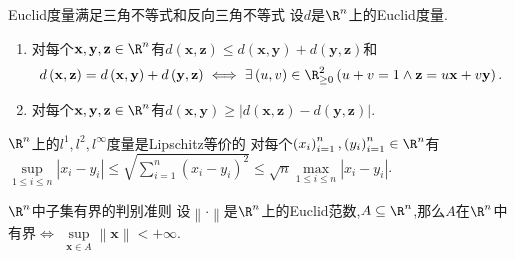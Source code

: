\begin{corollary}{Euclid度量满足三角不等式和反向三角不等式}{}
	设$d$是$\R^{n}$上的Euclid度量.
	\begin{enumerate}
		\item 对每个$\mathbf{x},\mathbf{y},\mathbf{z}\in\R^{n}$有$d\left(\mathbf{x},\mathbf{z}\right)\leq d\left(\mathbf{x},\mathbf{y}\right)+d\left(\mathbf{y},\mathbf{z}\right)$和
		\begin{align*}
			d\left(\mathbf{x},\mathbf{z}\right)=d\left(\mathbf{x},\mathbf{y}\right)+d\left(\mathbf{y},\mathbf{z}\right)\iff\exists\left(u,v\right)\in\R_{\geq 0}^{2}\left(u+v=1\wedge\mathbf{z}=u\mathbf{x}+v\mathbf{y}\right).
		\end{align*}
		\item 对每个$\mathbf{x},\mathbf{y},\mathbf{z}\in\R^{n}$有$d\left(\mathbf{x},\mathbf{y}\right)\geq\left|d\left(\mathbf{x},\mathbf{z}\right)-d\left(\mathbf{y},\mathbf{z}\right)\right|$.
	\end{enumerate}
\end{corollary}

\begin{proposition}{$\R^{n}$上的$l^{1},l^{2},l^{\infty}$度量是Lipschitz等价的}{}
	对每个$\left(x_{i}\right)_{i=1}^{n},\left(y_{i}\right)_{i=1}^{n}\in\R^{n}$有$\sup\limits_{1\leqslant i\leqslant n}\left|x_{i}-y_{i}\right|\leqslant\sqrt{\sum\limits_{i=1}^{n}\left(x_{i}-y_{i}\right)^{2}}\leqslant\sqrt{n}\max\limits_{1\leqslant i\leqslant n}\left|x_{i}-y_{i}\right|$.
\end{proposition}

\begin{corollary}{$\R^{n}$中子集有界的判别准则}{}
	设$\left\|\cdot\right\|$是$\R^{n}$上的Euclid范数,$A\subseteq\R^{n}$,那么$A$在$\R^{n}$中有界$\iff$ $\sup\limits_{\mathbf{x}\in A}\left\|\mathbf{x}\right\|<+\infty$.
\end{corollary}